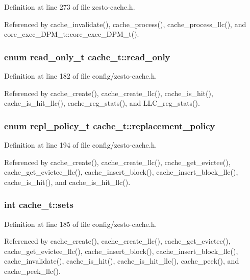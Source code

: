 Definition at line 273 of file zesto-cache.h.

Referenced by cache\_\-invalidate(), cache\_\-process(), cache\_\-process\_\-llc(), and core\_\-exec\_\-DPM\_\-t::core\_\-exec\_\-DPM\_\-t().
\subsubsection[{read\_\-only}]{\setlength{\rightskip}{0pt plus 5cm}enum {\bf read\_\-only\_\-t} {\bf cache\_\-t::read\_\-only}}\label{structcache__t_bf3cdeab774a246aa639b01633542337}




Definition at line 182 of file config/zesto-cache.h.

Referenced by cache\_\-create(), cache\_\-create\_\-llc(), cache\_\-is\_\-hit(), cache\_\-is\_\-hit\_\-llc(), cache\_\-reg\_\-stats(), and LLC\_\-reg\_\-stats().
\subsubsection[{replacement\_\-policy}]{\setlength{\rightskip}{0pt plus 5cm}enum {\bf repl\_\-policy\_\-t} {\bf cache\_\-t::replacement\_\-policy}}\label{structcache__t_11c6495bff25d1d686125a921df5180a}




Definition at line 194 of file config/zesto-cache.h.

Referenced by cache\_\-create(), cache\_\-create\_\-llc(), cache\_\-get\_\-evictee(), cache\_\-get\_\-evictee\_\-llc(), cache\_\-insert\_\-block(), cache\_\-insert\_\-block\_\-llc(), cache\_\-is\_\-hit(), and cache\_\-is\_\-hit\_\-llc().
\subsubsection[{sets}]{\setlength{\rightskip}{0pt plus 5cm}int {\bf cache\_\-t::sets}}\label{structcache__t_4e084e932e208ca35fc46b0de3bed2f4}




Definition at line 185 of file config/zesto-cache.h.

Referenced by cache\_\-create(), cache\_\-create\_\-llc(), cache\_\-get\_\-evictee(), cache\_\-get\_\-evictee\_\-llc(), cache\_\-insert\_\-block(), cache\_\-insert\_\-block\_\-llc(), cache\_\-invalidate(), cache\_\-is\_\-hit(), cache\_\-is\_\-hit\_\-llc(), cache\_\-peek(), and cache\_\-peek\_\-llc().

